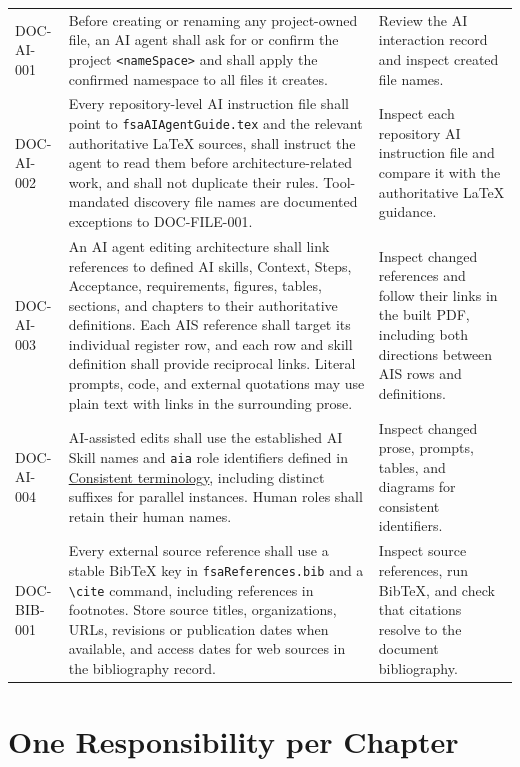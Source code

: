 \begin{tabularx}{\linewidth}{L{2.5cm}Y L{3.0cm}}
DOC-AI-001 & Before creating or renaming any project-owned file, an AI agent
shall ask for or confirm the project \texttt{\textless nameSpace\textgreater}
and shall apply the confirmed namespace to all files it creates. & Review the
AI interaction record and inspect created file names.\\
DOC-AI-002 & Every repository-level AI instruction file shall point to
\texttt{fsaAIAgentGuide.tex} and the relevant authoritative LaTeX sources,
shall instruct the agent to read them before architecture-related work, and
shall not duplicate their rules. Tool-mandated discovery file names are
documented exceptions to DOC-FILE-001. & Inspect each repository AI instruction
file and compare it with the authoritative LaTeX guidance.\\
\label{Requirement:DOCAI003}DOC-AI-003 & An AI agent editing
architecture shall link references to defined AI skills, Context, Steps,
Acceptance, requirements, figures, tables, sections, and chapters to their
authoritative definitions. Each AIS reference shall target its individual
register row, and each row and skill definition shall provide reciprocal links.
Literal prompts, code, and external quotations may use plain text with links
in the surrounding prose. & Inspect changed references and follow their links
in the built PDF, including both directions between AIS rows and definitions.\\
\label{Requirement:DOCAI004}DOC-AI-004 & AI-assisted edits shall use the established AI Skill names and \texttt{aia} role identifiers defined in \hyperref[Rule:AITerminologyConsistency]{Consistent terminology}, including distinct suffixes for parallel instances. Human roles shall retain their human names. & Inspect changed prose, prompts, tables, and diagrams for consistent identifiers.\\
\label{Requirement:DOCBIB001}DOC-BIB-001 & Every external source reference shall use a stable BibTeX key in \texttt{fsaReferences.bib} and a \texttt{\textbackslash cite} command, including references in footnotes. Store source titles, organizations, URLs, revisions or publication dates when available, and access dates for web sources in the bibliography record. & Inspect source references, run BibTeX, and check that citations resolve to the document bibliography.\\
\end{tabularx}
\normalsize

\section{One Responsibility per Chapter}
\label{Section:ChapterResponsibilityConvention}

